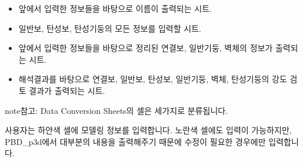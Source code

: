 \documentclass[a4paper,11pt,korean,openany,oneside]{sphinxmanual}
\begin{document}
\begin{itemize}
\begin{description}
\end{description}

\item {} \begin{description}
\sphinxAtStartPar
앞에서 입력한 정보들을 바탕으로 이름이 출력되는 시트.

\end{description}

\item {} \begin{description}
\sphinxAtStartPar
일반보, 탄성보, 탄성기둥의 모든 정보를 입력할 시트.

\end{description}

\item {} \begin{description}
\sphinxAtStartPar
앞에서 입력한 정보들을 바탕으로 정리된 연결보, 일반기둥, 벽체의 정보가 출력되는 시트.

\end{description}

\item {} \begin{description}
\sphinxAtStartPar
해석결과를 바탕으로 연결보, 일반보, 탄성보, 일반기둥, 벽체, 탄성기둥의 강도 검토 결과가 출력되는 시트.

\end{description}

\end{itemize}

\newpage

\begin{sphinxadmonition}{note}{참고:}
\sphinxAtStartPar
Data Conversion Sheets의 셀은 세가지로 분류됩니다.


\sphinxAtStartPar
사용자는 하얀색 셀에 모델링 정보를 입력합니다.
노란색 셀에도 입력이 가능하지만, PBD\_p3d에서 대부분의 내용을 출력해주기 때문에 수정이 필요한 경우에만 입력합니다.
\end{sphinxadmonition}
\end{document}
